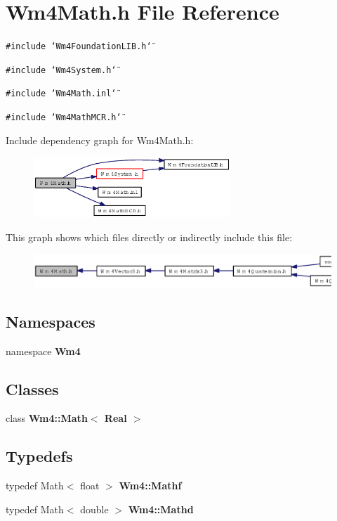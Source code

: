 \section{Wm4Math.h File Reference}
\label{Wm4Math_8h}
{\tt \#include \char`\"{}Wm4Foundation\-LIB.h\char`\"{}}\par
{\tt \#include \char`\"{}Wm4System.h\char`\"{}}\par
{\tt \#include \char`\"{}Wm4Math.inl\char`\"{}}\par
{\tt \#include \char`\"{}Wm4Math\-MCR.h\char`\"{}}\par


Include dependency graph for Wm4Math.h:\begin{figure}[H]
\begin{center}
\leavevmode
\includegraphics[width=210pt]{Wm4Math_8h__incl}
\end{center}
\end{figure}


This graph shows which files directly or indirectly include this file:\begin{figure}[H]
\begin{center}
\leavevmode
\includegraphics[width=337pt]{Wm4Math_8h__dep__incl}
\end{center}
\end{figure}
\subsection*{Namespaces}
\begin{CompactItemize}
\item 
namespace {\bf Wm4}
\end{CompactItemize}
\subsection*{Classes}
\begin{CompactItemize}
\item 
class {\bf Wm4::Math$<$ Real $>$}
\end{CompactItemize}
\subsection*{Typedefs}
\begin{CompactItemize}
\item 
typedef Math$<$ float $>$ {\bf Wm4::Mathf}
\item 
typedef Math$<$ double $>$ {\bf Wm4::Mathd}
\end{CompactItemize}
